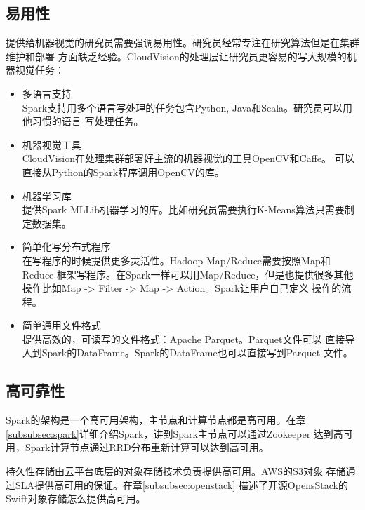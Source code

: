 \subsection{易用性}
提供给机器视觉的研究员需要强调易用性。研究员经常专注在研究算法但是在集群维护和部署
方面缺乏经验。CloudVision的处理层让研究员更容易的写大规模的机器视觉任务：
\begin{itemize}
  \item 多语言支持 \\
        Spark支持用多个语言写处理的任务包含Python, Java和Scala。研究员可以用他习惯的语言
        写处理任务。
  \item 机器视觉工具 \\
        CloudVision在处理集群部署好主流的机器视觉的工具OpenCV和Caffe。
        可以直接从Python的Spark程序调用OpenCV的库。
  \item 机器学习库 \\
        提供Spark MLLib机器学习的库。比如研究员需要执行K-Means算法只需要制定数据集。
  \item 简单化写分布式程序 \\
        在写程序的时候提供更多灵活性。Hadoop Map/Reduce需要按照Map和Reduce
        框架写程序。在Spark一样可以用Map/Reduce，但是也提供很多其他
        操作比如Map -> Filter -> Map -> Action。Spark让用户自己定义
        操作的流程。
  \item 简单通用文件格式 \\
        提供高效的，可读写的文件格式：Apache Parquet。Parquet文件可以
        直接导入到Spark的DataFrame。Spark的DataFrame也可以直接写到Parquet
        文件。
\end{itemize}


\subsection{高可靠性}
Spark的架构是一个高可用架构，主节点和计算节点都是高可用。在章
\ref{subsubsec:spark}详细介绍Spark，讲到Spark主节点可以通过Zookeeper
达到高可用，Spark计算节点通过RRD分布重新计算可以达到高可用。

持久性存储由云平台底层的对象存储技术负责提供高可用。AWS的S3对象
存储通过SLA提供高可用的保证。在章\ref{subsubsec:openstack}
描述了开源OpensStack的Swift对象存储怎么提供高可用。

